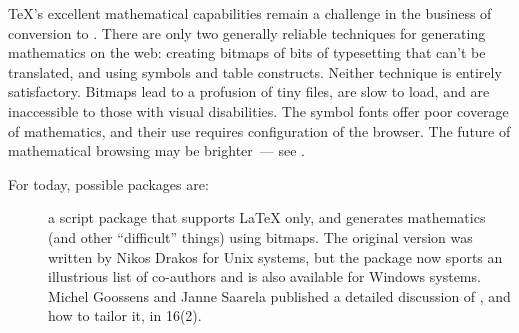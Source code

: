 \TeX{}'s excellent mathematical capabilities remain a challenge in the
business of conversion to .  There are only two generally
reliable techniques for generating mathematics on the web: creating
bitmaps of bits of typesetting that can't be translated, and using
symbols and table constructs.  Neither technique is entirely
satisfactory.  Bitmaps lead to a profusion of tiny files, are slow to
load, and are inaccessible to those with visual disabilities.  The
symbol fonts offer poor coverage of mathematics, and their use
requires configuration of the browser.  The future of mathematical
browsing may be brighter~--- see
.

For today, possible packages are:
\begin{description}
\item[]a  script package that
  supports \LaTeX{} only, and generates mathematics (and other
  ``difficult'' things) using bitmaps.  The original version was
  written by Nikos Drakos for Unix systems, but the package now sports
  an illustrious list of co-authors and is also available for Windows
  systems.  Michel Goossens and Janne Saarela published a detailed
  discussion of , and how to tailor it, in
  \TUGboat{} 16(2).


\end{description}
